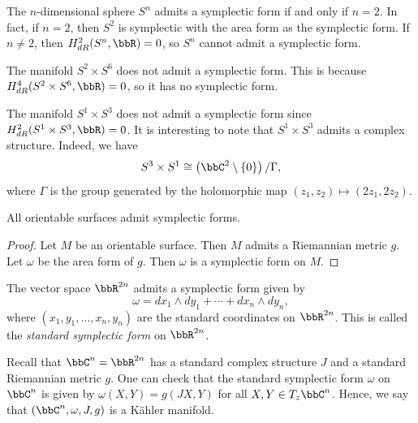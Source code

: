     \begin{example}
        The \(n\)-dimensional sphere \(S^n\) admits a symplectic form if and only if \(n=2\). 
        In fact, if \(n=2\), then \(S^2\) is symplectic with the area form as the symplectic form. 
        If \(n\neq 2\), then \(H^2_{dR}(S^n,\bbR)=0\), so \(S^n\) cannot admit a symplectic form.
    \end{example}

    \begin{example}
        The manifold \(S^2 \times S^6\) does not admit a symplectic form. 
        This is because \(H^4_{dR}(S^2 \times S^6,\bbR) = 0\), so it has no symplectic form.
    \end{example}

    \begin{example}
        The manifold \(S^1 \times S^3\) does not admit a symplectic form since \(H^2_{dR}(S^1 \times S^3,\bbR) = 0\).
        It is interesting to note that \(S^1 \times S^3\) admits a complex structure.
        Indeed, we have 
        \[ S^3 \times S^1 \cong \left( \bbC^2 \setminus \{0\} \right) / \Gamma, \]
        where \(\Gamma\) is the group generated by the holomorphic map \((z_1,z_2) \mapsto (2z_1, 2z_2)\).
    \end{example}

    \begin{theorem}
        All orientable surfaces admit symplectic forms.
    \end{theorem}
    \begin{proof}
        Let \(M\) be an orientable surface. 
        Then \(M\) admits a Riemannian metric \(g\). 
        Let \(\omega\) be the area form of \(g\). 
        Then \(\omega\) is a symplectic form on \(M\).
    \end{proof}

    \begin{example}
        The vector space \(\bbR^{2n}\) admits a symplectic form given by
        \[ \omega = dx_1 \wedge dy_1 + \cdots + dx_n \wedge dy_n, \]
        where \((x_1,y_1,\ldots,x_n,y_n)\) are the standard coordinates on \(\bbR^{2n}\).
        This is called the \emph{standard symplectic form} on \(\bbR^{2n}\).
    \end{example}

    Recall that \(\bbC^n = \bbR^{2n}\) has a standard complex structure \(J\) and a standard Riemannian metric \(g\).
    One can check that the standard symplectic form \(\omega\) on \(\bbC^n\) is given by \(\omega(X,Y) = g(JX,Y)\) for all \(X,Y \in T_z\bbC^n\).
    Hence, we say that \((\bbC^n, \omega, J, g)\) is a Kähler manifold.

